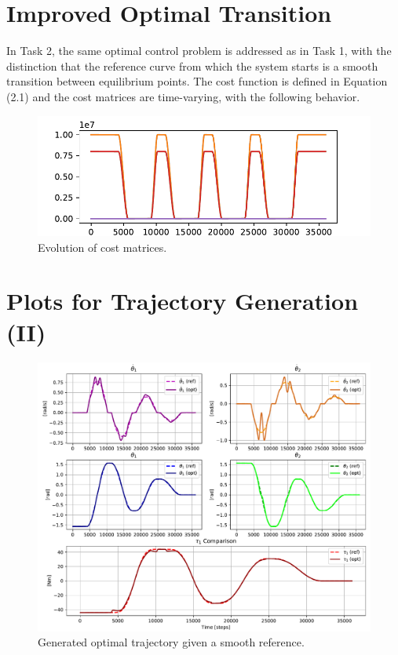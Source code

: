 \section{Improved Optimal Transition}
In Task 2, the same optimal control problem is addressed as in Task 1, with the distinction that the reference curve from which the system starts is a smooth transition between equilibrium points. The cost function is defined in Equation (2.1) and the cost matrices are time-varying, with the following behavior.

\begin{figure}[htb]
    \centering
    \includegraphics[width=1\linewidth]{img/2-task2/cost_evolution.pdf}
    \caption{Evolution of cost matrices.}
    \label{fig:dtheta2-evolution}
\end{figure}


\newpage
\section{Plots for Trajectory Generation (II)}
\begin{figure}[htb]
    \centering
    \includegraphics[width=1\linewidth]{img/2-task2/Residuals.pdf}
    \caption{Generated optimal trajectory given a smooth reference.} %
    \label{fig:optimal-step}
\end{figure}

